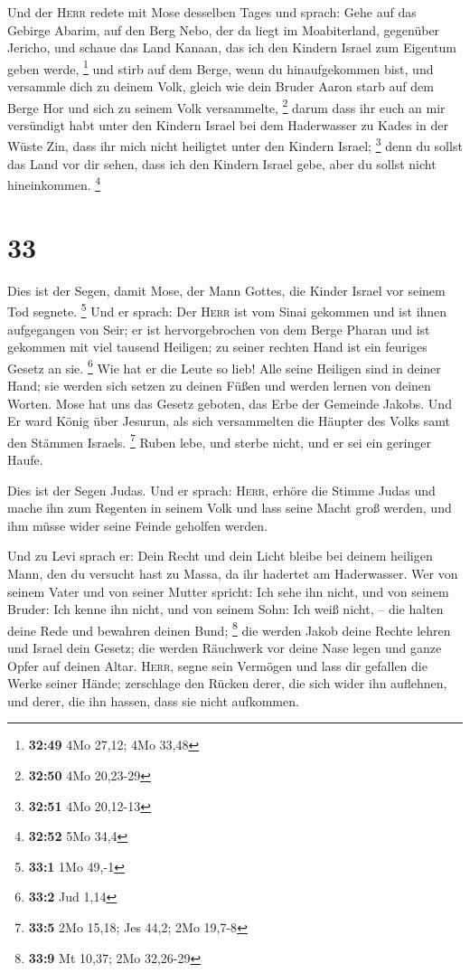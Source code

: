  Und der \textsc{Herr} redete mit Mose desselben Tages
und sprach:  Gehe auf das Gebirge Abarim, auf den Berg
Nebo, der da liegt im Moabiterland, gegenüber Jericho, und schaue das
Land Kanaan, das ich den Kindern Israel zum Eigentum geben werde,
\footnote{\textbf{32:49} 4Mo 27,12; 4Mo 33,48}  und stirb
auf dem Berge, wenn du hinaufgekommen bist, und versammle dich zu deinem
Volk, gleich wie dein Bruder Aaron starb auf dem Berge Hor und sich zu
seinem Volk versammelte, \footnote{\textbf{32:50} 4Mo 20,23-29}
 darum dass ihr euch an mir versündigt habt unter den
Kindern Israel bei dem Haderwasser zu Kades in der Wüste Zin, dass ihr
mich nicht heiligtet unter den Kindern Israel; \footnote{\textbf{32:51}
  4Mo 20,12-13}  denn du sollst das Land vor dir sehen,
dass ich den Kindern Israel gebe, aber du sollst nicht hineinkommen.
\footnote{\textbf{32:52} 5Mo 34,4}

\hypertarget{section-10}{%
\section{33}\label{section-10}}

 Dies ist der Segen, damit Mose, der Mann Gottes, die
Kinder Israel vor seinem Tod segnete. \footnote{\textbf{33:1} 1Mo 49,-1}
 Und er sprach: Der \textsc{Herr} ist vom Sinai gekommen
und ist ihnen aufgegangen von Seir; er ist hervorgebrochen von dem Berge
Pharan und ist gekommen mit viel tausend Heiligen; zu seiner rechten
Hand ist ein feuriges Gesetz an sie. \footnote{\textbf{33:2} Jud 1,14}
 Wie hat er die Leute so lieb! Alle seine Heiligen sind in
deiner Hand; sie werden sich setzen zu deinen Füßen und werden lernen
von deinen Worten.  Mose hat uns das Gesetz geboten, das
Erbe der Gemeinde Jakobs.  Und Er ward König über Jesurun,
als sich versammelten die Häupter des Volks samt den Stämmen Israels.
\footnote{\textbf{33:5} 2Mo 15,18; Jes 44,2; 2Mo 19,7-8} 
Ruben lebe, und sterbe nicht, und er sei ein geringer Haufe.

 Dies ist der Segen Judas. Und er sprach: \textsc{Herr},
erhöre die Stimme Judas und mache ihn zum Regenten in seinem Volk und
lass seine Macht groß werden, und ihm müsse wider seine Feinde geholfen
werden.

 Und zu Levi sprach er: Dein Recht und dein Licht bleibe
bei deinem heiligen Mann, den du versucht hast zu Massa, da ihr hadertet
am Haderwasser.  Wer von seinem Vater und von seiner
Mutter spricht: Ich sehe ihn nicht, und von seinem Bruder: Ich kenne ihn
nicht, und von seinem Sohn: Ich weiß nicht, -- die halten deine Rede und
bewahren deinen Bund; \footnote{\textbf{33:9} Mt 10,37; 2Mo 32,26-29}
 die werden Jakob deine Rechte lehren und Israel dein
Gesetz; die werden Räuchwerk vor deine Nase legen und ganze Opfer auf
deinen Altar.  \textsc{Herr}, segne sein Vermögen und
lass dir gefallen die Werke seiner Hände; zerschlage den Rücken derer,
die sich wider ihn auflehnen, und derer, die ihn hassen, dass sie nicht
aufkommen.

